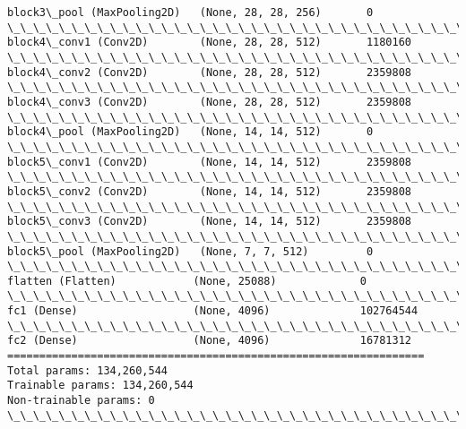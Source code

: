 \documentclass[11pt]{article}
\begin{document}
\begin{Verbatim}[commandchars=\\\{\}]
block3\_pool (MaxPooling2D)   (None, 28, 28, 256)       0         
\_\_\_\_\_\_\_\_\_\_\_\_\_\_\_\_\_\_\_\_\_\_\_\_\_\_\_\_\_\_\_\_\_\_\_\_\_\_\_\_\_\_\_\_\_\_\_\_\_\_\_\_\_\_\_\_\_\_\_\_\_\_\_\_\_
block4\_conv1 (Conv2D)        (None, 28, 28, 512)       1180160   
\_\_\_\_\_\_\_\_\_\_\_\_\_\_\_\_\_\_\_\_\_\_\_\_\_\_\_\_\_\_\_\_\_\_\_\_\_\_\_\_\_\_\_\_\_\_\_\_\_\_\_\_\_\_\_\_\_\_\_\_\_\_\_\_\_
block4\_conv2 (Conv2D)        (None, 28, 28, 512)       2359808   
\_\_\_\_\_\_\_\_\_\_\_\_\_\_\_\_\_\_\_\_\_\_\_\_\_\_\_\_\_\_\_\_\_\_\_\_\_\_\_\_\_\_\_\_\_\_\_\_\_\_\_\_\_\_\_\_\_\_\_\_\_\_\_\_\_
block4\_conv3 (Conv2D)        (None, 28, 28, 512)       2359808   
\_\_\_\_\_\_\_\_\_\_\_\_\_\_\_\_\_\_\_\_\_\_\_\_\_\_\_\_\_\_\_\_\_\_\_\_\_\_\_\_\_\_\_\_\_\_\_\_\_\_\_\_\_\_\_\_\_\_\_\_\_\_\_\_\_
block4\_pool (MaxPooling2D)   (None, 14, 14, 512)       0         
\_\_\_\_\_\_\_\_\_\_\_\_\_\_\_\_\_\_\_\_\_\_\_\_\_\_\_\_\_\_\_\_\_\_\_\_\_\_\_\_\_\_\_\_\_\_\_\_\_\_\_\_\_\_\_\_\_\_\_\_\_\_\_\_\_
block5\_conv1 (Conv2D)        (None, 14, 14, 512)       2359808   
\_\_\_\_\_\_\_\_\_\_\_\_\_\_\_\_\_\_\_\_\_\_\_\_\_\_\_\_\_\_\_\_\_\_\_\_\_\_\_\_\_\_\_\_\_\_\_\_\_\_\_\_\_\_\_\_\_\_\_\_\_\_\_\_\_
block5\_conv2 (Conv2D)        (None, 14, 14, 512)       2359808   
\_\_\_\_\_\_\_\_\_\_\_\_\_\_\_\_\_\_\_\_\_\_\_\_\_\_\_\_\_\_\_\_\_\_\_\_\_\_\_\_\_\_\_\_\_\_\_\_\_\_\_\_\_\_\_\_\_\_\_\_\_\_\_\_\_
block5\_conv3 (Conv2D)        (None, 14, 14, 512)       2359808   
\_\_\_\_\_\_\_\_\_\_\_\_\_\_\_\_\_\_\_\_\_\_\_\_\_\_\_\_\_\_\_\_\_\_\_\_\_\_\_\_\_\_\_\_\_\_\_\_\_\_\_\_\_\_\_\_\_\_\_\_\_\_\_\_\_
block5\_pool (MaxPooling2D)   (None, 7, 7, 512)         0         
\_\_\_\_\_\_\_\_\_\_\_\_\_\_\_\_\_\_\_\_\_\_\_\_\_\_\_\_\_\_\_\_\_\_\_\_\_\_\_\_\_\_\_\_\_\_\_\_\_\_\_\_\_\_\_\_\_\_\_\_\_\_\_\_\_
flatten (Flatten)            (None, 25088)             0         
\_\_\_\_\_\_\_\_\_\_\_\_\_\_\_\_\_\_\_\_\_\_\_\_\_\_\_\_\_\_\_\_\_\_\_\_\_\_\_\_\_\_\_\_\_\_\_\_\_\_\_\_\_\_\_\_\_\_\_\_\_\_\_\_\_
fc1 (Dense)                  (None, 4096)              102764544 
\_\_\_\_\_\_\_\_\_\_\_\_\_\_\_\_\_\_\_\_\_\_\_\_\_\_\_\_\_\_\_\_\_\_\_\_\_\_\_\_\_\_\_\_\_\_\_\_\_\_\_\_\_\_\_\_\_\_\_\_\_\_\_\_\_
fc2 (Dense)                  (None, 4096)              16781312  
=================================================================
Total params: 134,260,544
Trainable params: 134,260,544
Non-trainable params: 0
\_\_\_\_\_\_\_\_\_\_\_\_\_\_\_\_\_\_\_\_\_\_\_\_\_\_\_\_\_\_\_\_\_\_\_\_\_\_\_\_\_\_\_\_\_\_\_\_\_\_\_\_\_\_\_\_\_\_\_\_\_\_\_\_\_

    \end{Verbatim}
\end{document}
